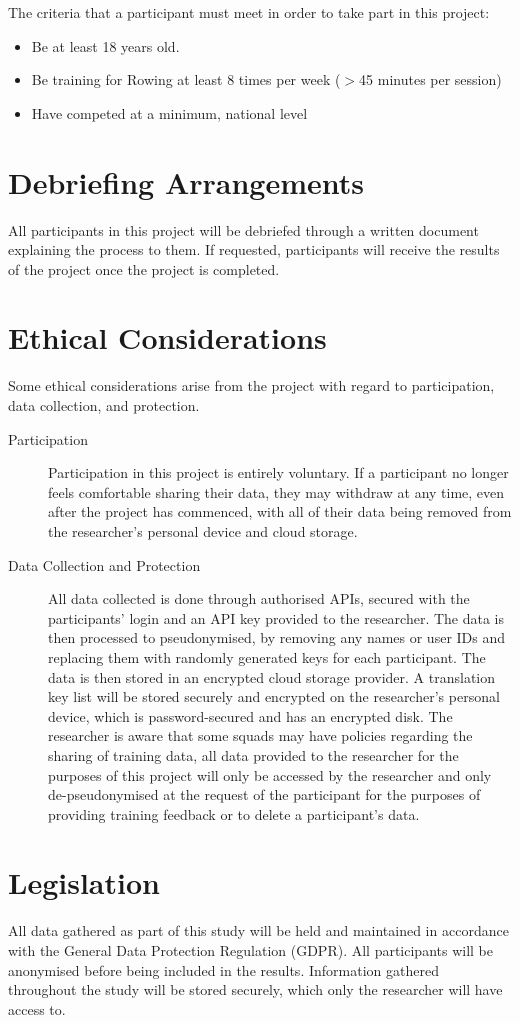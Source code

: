 The criteria that a participant must meet in order to take part in this project:
\begin{itemize}
    \item Be at least 18 years old.
    \item Be training for Rowing at least 8 times per week ($>$45 minutes per session)
    \item Have competed at a minimum, national level
\end{itemize}
\section*{Debriefing Arrangements}
All participants in this project will be debriefed through a written document explaining the process to them. If requested, participants will receive the results of the project once the project is completed.
\section*{Ethical Considerations}
Some ethical considerations arise from the project with regard to participation, data collection, and protection.
\begin{description}
    \item [Participation] Participation in this project is entirely voluntary. If a participant no longer feels comfortable sharing their data, they may withdraw at any time, even after the project has commenced, with all of their data being removed from the researcher's personal device and cloud storage.
    \item [Data Collection and Protection] All data collected is done through authorised APIs, secured with the participants' login and an API key provided to the researcher. The data is then processed to pseudonymised, by removing any names or user IDs and replacing them with randomly generated keys for each participant. The data is then stored in an encrypted cloud storage provider. A translation key list will be stored securely and encrypted on the researcher's personal device, which is password-secured and has an encrypted disk. The researcher is aware that some squads may have policies regarding the sharing of training data, all data provided to the researcher for the purposes of this project will only be accessed by the researcher and only de-pseudonymised at the request of the participant for the purposes of providing training feedback or to delete a participant's data.
\end{description}
\section*{Legislation}
All data gathered as part of this study will be held and maintained in accordance with the General Data Protection Regulation (GDPR). All participants will be anonymised before being included in the results. Information gathered throughout the study will be stored securely, which only the researcher will have access to.
